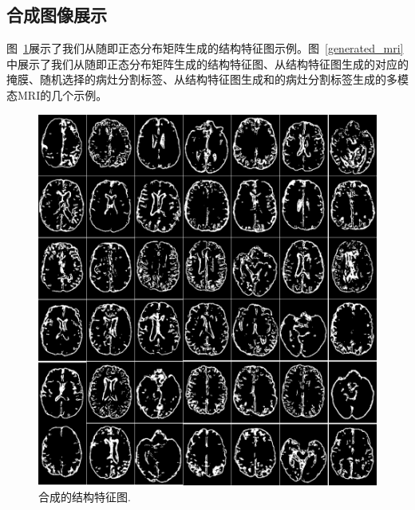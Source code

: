 \documentclass[letterpaper]{article} %
\begin{document}
\subsection{合成图像展示}
图~\ref{generated_f}展示了我们从随即正态分布矩阵生成的结构特征图示例。图~\ref{generated_mri}中展示了我们从随即正态分布矩阵生成的结构特征图、从结构特征图生成的对应的掩膜、随机选择的病灶分割标签、从结构特征图生成和的病灶分割标签生成的多模态MRI的几个示例。
\begin{figure}
	\centering
	\includegraphics[width=0.98\linewidth]{figures/Fs}
	\caption{合成的结构特征图.}
	\label{generated_f}
\end{figure}
\end{document}
